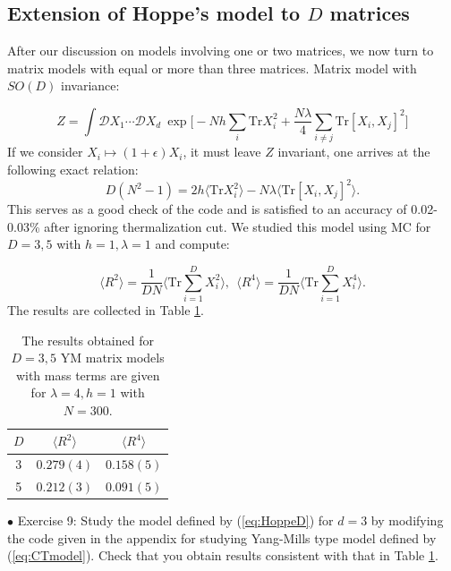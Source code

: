 \documentclass[11pt]{article}
\begin{document}
\subsection{\label{subsec:ext_Hoppe}Extension of Hoppe's model to $D$ matrices}

After our discussion on models involving one or two matrices, we now turn to matrix models 
with equal or more than three matrices. Matrix model with $SO(D)$ invariance:

\begin{equation}
\label{eq:HoppeD} 
	Z = \int \mathcal{D}X_1 \cdots \mathcal{D}X_d ~
	\exp\Big[ -Nh\sum_{i}\mbox{Tr}X_{i}^{2} + \frac{N\lambda}{4} \sum_{i \neq j} \mbox{Tr} [X_i,X_j]^{2}\Big]
\end{equation}
If we consider $X_i \mapsto (1+\epsilon) X_i$, it must leave $Z$ invariant, one arrives at the following exact relation: 
\begin{equation}
	D(N^2 -1) = 2 h \langle \mbox{Tr}X_{i}^{2} \rangle 
	- N \lambda \langle \mbox{Tr}[X_i,X_j]^{2} \rangle. 
\end{equation}
This serves as a good check of the code and is satisfied to an accuracy of 0.02-0.03\% after ignoring thermalization cut. We studied this model using MC for $D=3,5$ with $h=1, \lambda=1$ and compute: 

\begin{equation}
\label{eq:R2R4} 
	\langle R^2 \rangle =   \frac{1}{DN} \Bigg \langle \mbox{Tr} \sum_{i=1}^{D} X_{i}^2 \bigg \rangle, 
	~~ \langle R^4 \rangle =   \frac{1}{DN} \Bigg \langle \mbox{Tr} \sum_{i=1}^{D} X_{i}^4 \bigg \rangle.  
\end{equation}
The results are collected in Table \ref{table:D_YMM_data}. 

\begin{table}[h!]
	\centering
	\begin{tabular}{||c c c||} 
		\hline
		$D$ & $ \langle R^2 \rangle$ & $ \langle R^4 \rangle$ \\ [0.5ex] 
		\hline\hline
		3 & $ 0.279(4) $ & $ 0.158(5) $  \\ 
		5 & $ 0.212(3) $ & $ 0.091(5) $
		 \\ [1ex] 
		\hline 
	\end{tabular}
\caption{The results obtained for $D = 3,5$ YM matrix models with mass terms are given for $\lambda=4, h=1$ with $N=300$.}
\label{table:D_YMM_data}
\end{table}


\begin{mdframed}[backgroundcolor=blue!3] 
	\textsc{} 
	$\bullet$ Exercise 9: Study the model defined by (\ref{eq:HoppeD}) for $d=3$ by modifying the code given in the appendix for studying Yang-Mills type model defined by (\ref{eq:CTmodel}). Check that you obtain results consistent
	with that in Table \ref{table:D_YMM_data}.  
\end{mdframed}
\end{document}
